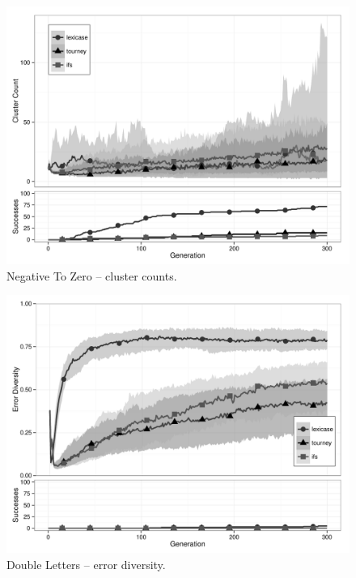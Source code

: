 \begin{figure}[p] %
\centering
\includegraphics[width=11.5cm]{negative-to-zero-cluster.pdf}
\caption{Negative To Zero -- cluster counts.}
\label{negative-to-zeroClu}
\end{figure}

\begin{figure}[p] %
\centering
\includegraphics[width=11.5cm]{double-letters-diversity.pdf}
\caption{Double Letters -- error diversity.}
\label{double-lettersDiv}
\end{figure}

